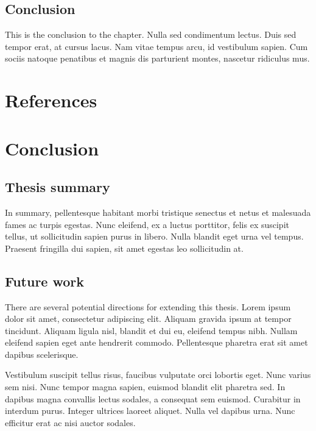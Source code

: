 \documentclass[12pt,a4paperpaper,]{report}
\begin{document}
\section{Conclusion}\label{conclusion-6}

This is the conclusion to the chapter. Nulla sed condimentum lectus.
Duis sed tempor erat, at cursus lacus. Nam vitae tempus arcu, id
vestibulum sapien. Cum sociis natoque penatibus et magnis dis parturient
montes, nascetur ridiculus mus.

\footnotesize

\chapter{References}\label{references}

\chapter{Conclusion}\label{conclusion-7}

\section{Thesis summary}\label{thesis-summary}

In summary, pellentesque habitant morbi tristique senectus et netus et
malesuada fames ac turpis egestas. Nunc eleifend, ex a luctus porttitor,
felis ex suscipit tellus, ut sollicitudin sapien purus in libero. Nulla
blandit eget urna vel tempus. Praesent fringilla dui sapien, sit amet
egestas leo sollicitudin at.

\section{Future work}\label{future-work}

There are several potential directions for extending this thesis. Lorem
ipsum dolor sit amet, consectetur adipiscing elit. Aliquam gravida ipsum
at tempor tincidunt. Aliquam ligula nisl, blandit et dui eu, eleifend
tempus nibh. Nullam eleifend sapien eget ante hendrerit commodo.
Pellentesque pharetra erat sit amet dapibus scelerisque.

Vestibulum suscipit tellus risus, faucibus vulputate orci lobortis eget.
Nunc varius sem nisi. Nunc tempor magna sapien, euismod blandit elit
pharetra sed. In dapibus magna convallis lectus sodales, a consequat sem
euismod. Curabitur in interdum purus. Integer ultrices laoreet aliquet.
Nulla vel dapibus urna. Nunc efficitur erat ac nisi auctor sodales.
\end{document}
